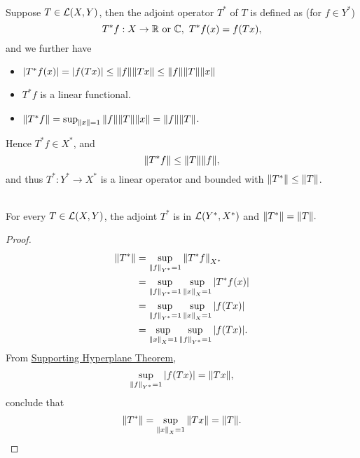 \vspace{6pt}
\begin{definition}\ \\
Suppose $T \in \mathcal{L}(X,Y)$, then the adjoint operator $T^*$ of $T$ is defined as (for $f \in Y^*$)
\begin{equation*}
    T^* f : X \to \mathbb{R} \text{ or } \mathbb{C},\ T^*f(x) = f(Tx),
\end{equation*}
and we further have
\begin{itemize}
    \item $\abs{T^* f(x)} = \abs{f(Tx)} \leq \norm{f} \norm{Tx} \leq \norm{f} \norm{T} \norm{x}$
    \item $T^* f$ is a linear functional.
    \item $\norm{T^* f} = \sup_{\norm{x} = 1} \norm{f}\norm{T}\norm{x} = \norm{f} \norm{T}$.
\end{itemize}
Hence $T^* f \in X^*$, and 
\begin{equation*}
    \norm{T^* f} \leq \norm{T}\norm{f},
\end{equation*}
and thus $T^*: Y^* \to X^*$ is a linear operator and bounded with $\norm{T^*} \leq \norm{T}$.
\end{definition}


\vspace{3pt}
\begin{proposition}\ \\
For every $T \in \mathcal{L}(X,Y)$, the adjoint $T^*$ is in $\mathcal{L}(Y^*, X^*)$ and $\norm{T^*} = \norm{T}.$
\end{proposition}
\begin{proof}\ 
\begin{align*}
    \norm{T^*} &= \sup_{\norm{f}_{Y^*} = 1} \norm{T^* f}_{X^*}\\ 
    &= \sup_{\norm{f}_{Y^*} = 1} \sup_{\norm{x}_X = 1} \abs{T^* f(x)}\\
    &= \sup_{\norm{f}_{Y^*} = 1} \sup_{\norm{x}_X = 1} \abs{f(Tx)}\\
    &=  \sup_{\norm{x}_X = 1} \sup_{\norm{f}_{Y^*} = 1}\abs{f(Tx)}.
\end{align*}
From \hyperref[SHT]{Supporting Hyperplane Theorem}, 
\begin{equation*}
    \sup_{\norm{f}_{Y^*} = 1} \abs{f(Tx)} = \norm{Tx},
\end{equation*}
conclude that
\begin{equation*}
    \norm{T^*} = \sup_{\norm{x}_X = 1} \norm{Tx} = \norm{T}.
\end{equation*}
\end{proof}

